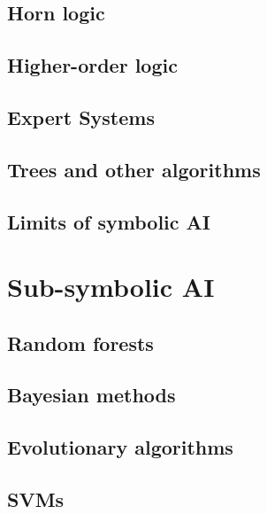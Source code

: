\documentclass[12pt,a4paper,openright,twoside]{book}
\begin{document}
\subsection{Horn logic}\label{subsec:horn-logic}

\subsection{Higher-order logic}\label{subsec:higher-order-logic}

\subsection{Expert Systems}\label{subsec:expert-systems}

\subsection{Trees and other algorithms}\label{subsec:trees-and-other-algorithms}

\subsection{Limits of symbolic \ac{AI}}\label{subsec:limits-of-symbolic-ai}

\section{Sub-symbolic \ac{AI}}\label{sec:sub-symbolic-ai}

\subsection{Random forests}\label{subsec:random-forests}

\subsection{Bayesian methods}\label{subsec:bayesian-methods}

\subsection{Evolutionary algorithms}\label{subsec:evolutionary-algorithms}

\subsection{\Aclp{SVM}}\label{subsec:svm}
\end{document}
